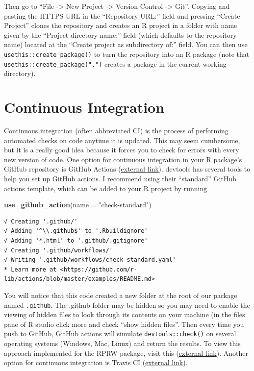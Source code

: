 \documentclass[
]{book}
\newenvironment{Shaded}{\begin{snugshade}}{\end{snugshade}}
\newcommand{\DataTypeTok}[1]{\textcolor[rgb]{0.13,0.29,0.53}{#1}}
\newcommand{\KeywordTok}[1]{\textcolor[rgb]{0.13,0.29,0.53}{\textbf{#1}}}
\newcommand{\NormalTok}[1]{#1}
\newcommand{\StringTok}[1]{\textcolor[rgb]{0.31,0.60,0.02}{#1}}
\begin{document}
Then go to ``File -\textgreater{} New Project -\textgreater{} Version Control -\textgreater{} Git''. Copying and pasting the HTTPS URL in the ``Repository URL:'' field and pressing ``Create Project'' clones the repository and creates an R project in a folder with name given by the ``Project directory name:'' field (which defaults to the repository name) located at the ``Create project as subdirectory of:'' field. You can then use \texttt{usethis::create\_package()} to turn the repository into an R package (note that \texttt{usethis::create\_package(".")} creates a package in the current working directory).

\hypertarget{ci}{%
\section{Continuous Integration}\label{ci}}

Continuous integration (often abbreviated CI) is the process of performing automated checks on code anytime it is updated. This may seem cumbersome, but it is a really good idea because it forces you to check for errors with every new version of code. One option for continuous integration in your R package's GitHub repository is GitHub Actions (\href{https://github.com/features/actions}{external link}). devtools has several tools to help you set up GitHub actions. I recommend using their ``standard'' GitHub actions template, which can be added to your R project by running

\begin{Shaded}
\begin{Highlighting}[]
\KeywordTok{use_github_action}\NormalTok{(}\DataTypeTok{name =} \StringTok{"check-standard"}\NormalTok{)}
\end{Highlighting}
\end{Shaded}

\begin{verbatim}
√ Creating '.github/'
√ Adding '^\\.github$' to '.Rbuildignore'
√ Adding '*.html' to '.github/.gitignore'
√ Creating '.github/workflows/'
√ Writing '.github/workflows/check-standard.yaml'
* Learn more at <https://github.com/r-lib/actions/blob/master/examples/README.md>
\end{verbatim}

You will notice that this code created a new folder at the root of our package named \texttt{.github}. The .github folder may be hidden so you may need to enable the viewing of hidden files to look through its contents on your machine (in the files pane of R studio click more and check ``show hidden files''. Then every time you push to GitHub, GitHub actions will simulate \texttt{devtools::check()} on several operating systems (Windows, Mac, Linux) and return the results. To view this approach implemented for the RPRW package, visit this (\href{https://github.com/michaeldumelle/RPRW/actions}{external link}). Another option for continuous integration is Travis CI (\href{https://travis-ci.org/}{external link}).
\end{document}
